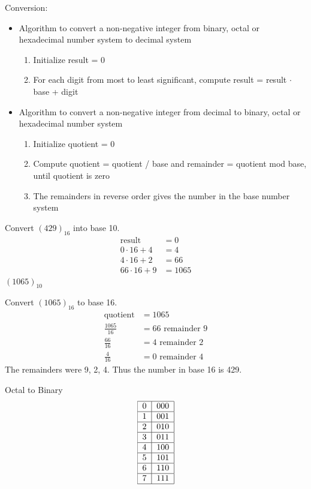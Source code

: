 \documentclass[12pt]{article}
\begin{document}
Conversion: \begin{itemize} 
\item Algorithm to convert a non-negative integer from binary, octal or hexadecimal number system to decimal system \begin{enumerate} 
\item Initialize result = 0 \item For each digit from most to least significant, compute result = result $\cdot$ base + digit \end{enumerate} \newpage
\item Algorithm to convert a non-negative integer from decimal to binary, octal or hexadecimal number system \begin{enumerate} 
\item Initialize quotient = 0 \item Compute quotient = quotient / base and remainder = quotient mod base, until quotient is zero \item The remainders in reverse order gives the number in the base number system \end{enumerate} \end{itemize} 
\begin{example} Convert $(429)_{16}$ into base 10. $$\begin{aligned} \text{result} &= 0 \\ 0 \cdot 16 + 4 &= 4 \\ 4 \cdot 16 + 2 &= 66 \\ 66 \cdot 16 + 9 &= 1065 \end{aligned} $$ $(1065)_{10}$ \end{example} 
\begin{example} Convert $(1065)_{16}$ to base 16. $$\begin{aligned} \text{quotient} &= 1065 \\ \frac{1065}{16} &= 66 \text{ remainder 9} \\ \frac{66}{16} &= 4 \text{ remainder 2} \\ \frac{4}{16} &= 0 \text{ remainder 4} \end{aligned} $$ The remainders were 9, 2, 4. Thus the number in base 16 is 429. \end{example} 
Octal to Binary $$\begin{tabular}{|c|c|} \hline 0 & 000 \\ \hline 1 & 001 \\ \hline 2 & 010 \\ \hline 3 & 011 \\ \hline 4 & 100 \\ \hline 5 & 101 \\ \hline 6 & 110 \\ \hline 7 & 111 \\ \hline \end{tabular} $$ 
\end{document}
